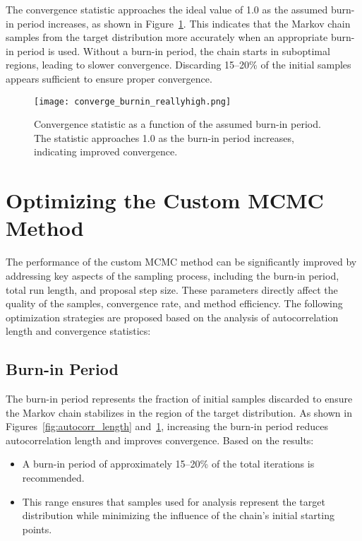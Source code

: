 \documentclass[twocolumn, 11pt]{article}
\begin{document}
The convergence statistic approaches the ideal value of 1.0 as the assumed burn-in period increases, as shown in Figure~\ref{fig:convergence_statistic}. This indicates that the Markov chain samples from the target distribution more accurately when an appropriate burn-in period is used. Without a burn-in period, the chain starts in suboptimal regions, leading to slower convergence. Discarding 15--20\% of the initial samples appears sufficient to ensure proper convergence.

\begin{figure}[h!]
    \centering
    \texttt{[image: converge\_burnin\_reallyhigh.png]}
    \caption{Convergence statistic as a function of the assumed burn-in period. The statistic approaches 1.0 as the burn-in period increases, indicating improved convergence.}
    \label{fig:convergence_statistic}
\end{figure}

\section{Optimizing the Custom MCMC Method}
The performance of the custom MCMC method can be significantly improved by addressing key aspects of the sampling process, including the burn-in period, total run length, and proposal step size. These parameters directly affect the quality of the samples, convergence rate, and method efficiency. The following optimization strategies are proposed based on the analysis of autocorrelation length and convergence statistics:

\subsection{Burn-in Period}
The burn-in period represents the fraction of initial samples discarded to ensure the Markov chain stabilizes in the region of the target distribution. As shown in Figures~\ref{fig:autocorr_length} and~\ref{fig:convergence_statistic}, increasing the burn-in period reduces autocorrelation length and improves convergence. Based on the results:
\begin{itemize}
    \item A burn-in period of approximately 15--20\% of the total iterations is recommended.
    \item This range ensures that samples used for analysis represent the target distribution while minimizing the influence of the chain's initial starting points.
\end{itemize}
\end{document}
